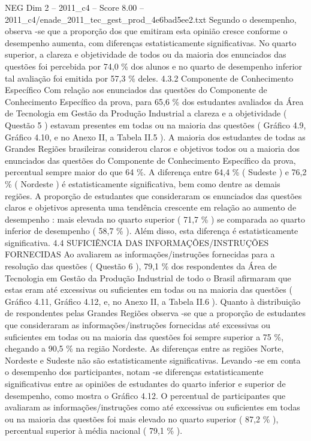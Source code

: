 \begin{textsample}{NEG Dim 2 – 2011\_c4 – Score 8.00 – 2011\_c4/enade\_2011\_tec\_gest\_prod\_4e6bad5ee2.txt}
Segundo o desempenho, observa -se que a proporção dos que emitiram esta opinião cresce conforme o desempenho aumenta, com diferenças estatisticamente significativas.
No quarto superior, a clareza e objetividade de todos ou da maioria dos enunciados das questões foi percebida por 74,0 \% dos alunos e no quarto de desempenho inferior tal avaliação foi emitida por 57,3 \% deles. 4.3.2 Componente de Conhecimento Específico Com relação aos enunciados das questões do Componente de Conhecimento Específico da prova, para 65,6 \% dos estudantes avaliados da Área de Tecnologia em Gestão da Produção Industrial a clareza e a objetividade ( Questão 5 ) estavam presentes em todas ou na maioria das questões ( Gráfico 4.9, Gráfico 4.10, e no Anexo II, a Tabela II.5 ).
A maioria dos estudantes de todas as Grandes Regiões brasileiras considerou claros e objetivos todos ou a maioria dos enunciados das questões do Componente de Conhecimento Específico da prova, percentual sempre maior do que 64 \%.
A diferença entre 64,4 \% ( Sudeste ) e 76,2 \% ( Nordeste ) é estatisticamente significativa, bem como dentre as demais regiões.
A proporção de estudantes que consideraram os enunciados das questões claros e objetivos apresenta uma tendência crescente em relação ao aumento de desempenho : mais elevada no quarto superior ( 71,7 \% ) se comparada ao quarto inferior de desempenho ( 58,7 \% ).
Além disso, esta diferença é estatisticamente significativa. 4.4 SUFICIÊNCIA DAS INFORMAÇÕES/INSTRUÇÕES FORNECIDAS Ao avaliarem as informações/instruções fornecidas para a resolução das questões ( Questão 6 ), 79,1 \% dos respondentes da Área de Tecnologia em Gestão da Produção Industrial de todo o Brasil afirmaram que estas eram até excessivas ou suficientes em todas ou na maioria das questões ( Gráfico 4.11, Gráfico 4.12, e, no Anexo II, a Tabela II.6 ).
Quanto à distribuição de respondentes pelas Grandes Regiões observa -se que a proporção de estudantes que consideraram as informações/instruções fornecidas até excessivas ou suficientes em todas ou na maioria das questões foi sempre superior a 75 \%, chegando a 90,5 \% na região Nordeste.
As diferenças entre as regiões Norte, Nordeste e Sudeste não são estatisticamente significativas.
Levando -se em conta o desempenho dos participantes, notam -se diferenças estatisticamente significativas entre as opiniões de estudantes do quarto inferior e superior de desempenho, como mostra o Gráfico 4.12.
O percentual de participantes que avaliaram as informações/instruções como até excessivas ou suficientes em todas ou na maioria das questões foi mais elevado no quarto superior ( 87,2 \% ), percentual superior à média nacional ( 79,1 \% ).

\end{textsample}
